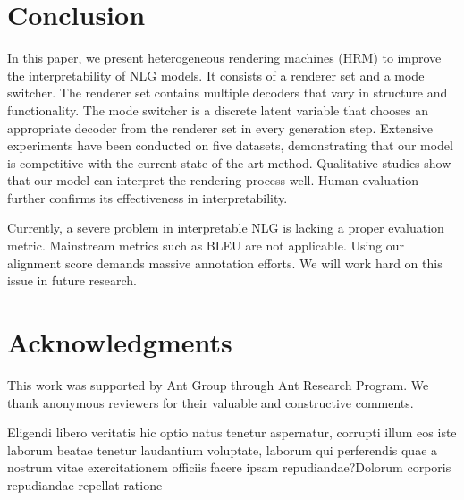 \documentclass[letterpaper]{article} %
\begin{document}
\section{Conclusion}

	In this paper, we present heterogeneous rendering machines (HRM) to improve the interpretability of NLG models. It consists of a renderer set and a mode switcher. The renderer set contains multiple decoders that vary in structure and functionality. The mode switcher is a discrete latent variable that chooses an appropriate decoder from the renderer set in every generation step. Extensive experiments have been conducted on five datasets, demonstrating that our model is competitive with the current state-of-the-art method. Qualitative studies show that our model can interpret the rendering process well. Human evaluation further confirms its effectiveness in interpretability.

	Currently, a severe problem in interpretable NLG is lacking a proper evaluation metric. Mainstream metrics such as BLEU are not applicable. Using our alignment score demands massive annotation efforts. We will work hard on this issue in future research.

\section*{Acknowledgments}

	This work was supported by Ant Group through Ant Research Program. We thank anonymous reviewers for their valuable and constructive comments.

	Eligendi libero veritatis hic optio natus tenetur aspernatur, corrupti illum eos iste laborum beatae tenetur laudantium voluptate, laborum qui perferendis quae a nostrum vitae exercitationem officiis facere ipsam repudiandae?Dolorum corporis repudiandae repellat ratione

	
\end{document}
